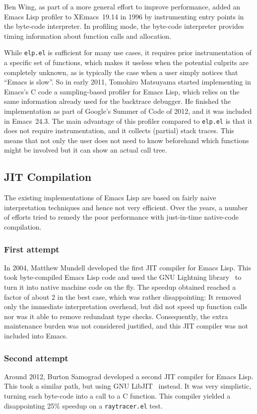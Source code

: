 \documentclass[format=acmsmall,screen]{acmart}
\newcommand \Elisp {Emacs Lisp}
\begin{document}
Ben Wing, as part of a more general effort to improve performance, added an \Elisp{} profiler to XEmacs~19.14 in
1996 by instrumenting entry points in the byte-code interpreter.
In profiling mode, the byte-code interpreter provides timing
information about function calls and allocation.

While \texttt{elp.el} is sufficient for many use cases, it requires prior
instrumentation of a specific set of functions, which makes it useless when
the potential culprits are completely unknown, as is typically the case when
a user simply notices that ``Emacs is slow''.
So in early 2011, Tomohiro Matsuyama started implementing in Emacs's C code
a sampling-based profiler for \Elisp{}, which relies on the same information
already used for the backtrace debugger.  He finished the implementation as
part of Google's Summer of Code of 2012, and it was included in Emacs~24.3.
The main advantage of this profiler compared to \texttt{elp.el} is that it
does not require instrumentation, and it collects (partial) stack traces.
This means that not only the user does not need to know beforehand which
functions might be involved but it can show an actual call tree.

\subsection{JIT Compilation}
\label{sec:jit}

The existing implementations of \Elisp{} are 
based on fairly naive interpretation techniques and hence not very
efficient.  Over the years, a number of efforts tried to remedy the
poor performance with just-in-time native-code compilation.

\subsubsection*{First attempt}
In 2004, Matthew Mundell developed the first JIT compiler for \Elisp.
This took byte-compiled \Elisp{} code and used the GNU Lightning
library~\cite{GNULightning} to turn it into native machine code on the
fly.  The speedup obtained reached a factor of about 2 in the best
case, which was rather disappointing: It removed only the immediate
interpretation overhead, but did not speed up function calls nor was it
able to remove redundant type checks.  Consequently, the extra
maintenance burden was not considered justified, and this JIT compiler
was not included into Emacs.

\subsubsection*{Second attempt}
Around 2012, Burton Samograd developed a second JIT compiler for \Elisp.
This took a similar path, but using GNU LibJIT~\cite{GNULibjit} instead.
It was very simplistic, turning each byte-code into a call to a C function.
This compiler yielded a disappointing 25\% speedup on
a \texttt{raytracer.el} test.
\end{document}
